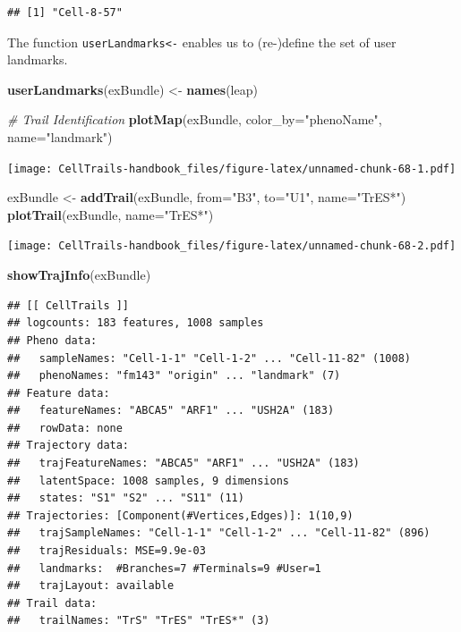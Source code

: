 \documentclass[]{book}
\newenvironment{Shaded}{\begin{snugshade}}{\end{snugshade}}
\newcommand{\KeywordTok}[1]{\textcolor[rgb]{0.13,0.29,0.53}{\textbf{#1}}}
\newcommand{\DataTypeTok}[1]{\textcolor[rgb]{0.13,0.29,0.53}{#1}}
\newcommand{\StringTok}[1]{\textcolor[rgb]{0.31,0.60,0.02}{#1}}
\newcommand{\CommentTok}[1]{\textcolor[rgb]{0.56,0.35,0.01}{\textit{#1}}}
\newcommand{\NormalTok}[1]{#1}
\theoremstyle{definition}
\theoremstyle{definition}
\theoremstyle{definition}
\theoremstyle{remark}
\begin{document}
\begin{verbatim}
## [1] "Cell-8-57"
\end{verbatim}

The function \texttt{userLandmarks\textless{}-} enables us to
(re-)define the set of user landmarks.

\begin{Shaded}
\begin{Highlighting}[]
\KeywordTok{userLandmarks}\NormalTok{(exBundle) <-}\StringTok{ }\KeywordTok{names}\NormalTok{(leap)}

\CommentTok{# Trail Identification}
\KeywordTok{plotMap}\NormalTok{(exBundle, }\DataTypeTok{color_by=}\StringTok{"phenoName"}\NormalTok{, }\DataTypeTok{name=}\StringTok{"landmark"}\NormalTok{)}
\end{Highlighting}
\end{Shaded}

\texttt{[image: CellTrails-handbook\_files/figure-latex/unnamed-chunk-68-1.pdf]}

\begin{Shaded}
\begin{Highlighting}[]
\NormalTok{exBundle <-}\StringTok{ }\KeywordTok{addTrail}\NormalTok{(exBundle, }\DataTypeTok{from=}\StringTok{"B3"}\NormalTok{, }\DataTypeTok{to=}\StringTok{"U1"}\NormalTok{, }\DataTypeTok{name=}\StringTok{"TrES*"}\NormalTok{)}
\KeywordTok{plotTrail}\NormalTok{(exBundle, }\DataTypeTok{name=}\StringTok{"TrES*"}\NormalTok{)}
\end{Highlighting}
\end{Shaded}

\texttt{[image: CellTrails-handbook\_files/figure-latex/unnamed-chunk-68-2.pdf]}

\begin{Shaded}
\begin{Highlighting}[]
\KeywordTok{showTrajInfo}\NormalTok{(exBundle)}
\end{Highlighting}
\end{Shaded}

\begin{verbatim}
## [[ CellTrails ]] 
## logcounts: 183 features, 1008 samples
## Pheno data: 
##   sampleNames: "Cell-1-1" "Cell-1-2" ... "Cell-11-82" (1008)
##   phenoNames: "fm143" "origin" ... "landmark" (7)
## Feature data: 
##   featureNames: "ABCA5" "ARF1" ... "USH2A" (183)
##   rowData: none
## Trajectory data: 
##   trajFeatureNames: "ABCA5" "ARF1" ... "USH2A" (183)
##   latentSpace: 1008 samples, 9 dimensions
##   states: "S1" "S2" ... "S11" (11)
## Trajectories: [Component(#Vertices,Edges)]: 1(10,9)
##   trajSampleNames: "Cell-1-1" "Cell-1-2" ... "Cell-11-82" (896)
##   trajResiduals: MSE=9.9e-03
##   landmarks:  #Branches=7 #Terminals=9 #User=1
##   trajLayout: available
## Trail data: 
##   trailNames: "TrS" "TrES" "TrES*" (3)
\end{verbatim}
\end{document}
